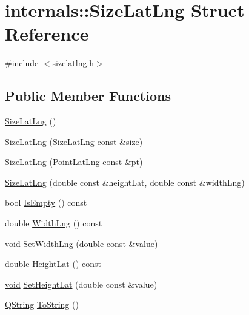 \hypertarget{structinternals_1_1_size_lat_lng}{\section{internals\-:\-:\-Size\-Lat\-Lng \-Struct \-Reference}
\label{structinternals_1_1_size_lat_lng}
}


{\ttfamily \#include $<$sizelatlng.\-h$>$}

\subsection*{\-Public \-Member \-Functions}
\begin{DoxyCompactItemize}
\item 
\hyperlink{group___o_p_map_widget_ga577f5727b9da5a209c90b8a1616d168c}{\-Size\-Lat\-Lng} ()
\item 
\hyperlink{group___o_p_map_widget_ga3981b48b207701daa66030fc596bfda2}{\-Size\-Lat\-Lng} (\hyperlink{structinternals_1_1_size_lat_lng}{\-Size\-Lat\-Lng} const \&size)
\item 
\hyperlink{group___o_p_map_widget_gaac692b4a2979e688baced1205991cf2a}{\-Size\-Lat\-Lng} (\hyperlink{structinternals_1_1_point_lat_lng}{\-Point\-Lat\-Lng} const \&pt)
\item 
\hyperlink{group___o_p_map_widget_ga1d7d8f77f50a09f416f4fd64170db374}{\-Size\-Lat\-Lng} (double const \&height\-Lat, double const \&width\-Lng)
\item 
bool \hyperlink{group___o_p_map_widget_ga33e0b9f4dd15b12e9a3053753a9d2335}{\-Is\-Empty} () const 
\item 
double \hyperlink{group___o_p_map_widget_ga4c692638cdb086a911d2bfc4a8d93f70}{\-Width\-Lng} () const 
\item 
\hyperlink{group___u_a_v_objects_plugin_ga444cf2ff3f0ecbe028adce838d373f5c}{void} \hyperlink{group___o_p_map_widget_ga73df3d96826b8dbf86b2676c759d867e}{\-Set\-Width\-Lng} (double const \&value)
\item 
double \hyperlink{group___o_p_map_widget_ga54840364c05e0258bc30df133bd36107}{\-Height\-Lat} () const 
\item 
\hyperlink{group___u_a_v_objects_plugin_ga444cf2ff3f0ecbe028adce838d373f5c}{void} \hyperlink{group___o_p_map_widget_gaf25f9fe7c877df23a2cce0194354c001}{\-Set\-Height\-Lat} (double const \&value)
\item 
\hyperlink{group___u_a_v_objects_plugin_gab9d252f49c333c94a72f97ce3105a32d}{\-Q\-String} \hyperlink{group___o_p_map_widget_ga70356ecffc32e8609752c282f95c7183}{\-To\-String} ()
\end{DoxyCompactItemize}

